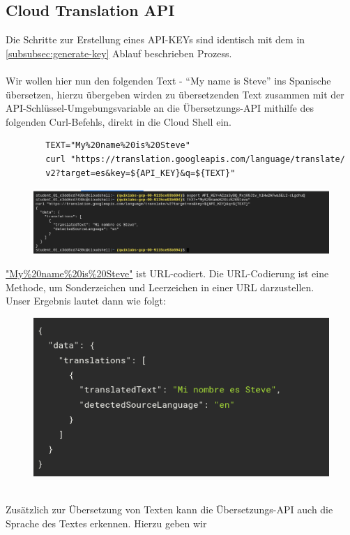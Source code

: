 \documentclass[12pt,a4paper]{article}
\begin{document}
\subsection{Cloud Translation API}
Die Schritte zur Erstellung eines API-KEYs sind identisch mit dem in \ref{subsubsec:generate-key} Ablauf beschrieben Prozess.
\\ \\
Wir wollen hier nun den folgenden Text - \enquote{My name is Steve} ins Spanische übersetzen, hierzu übergeben wirden zu übersetzenden Text zusammen mit der API-Schlüssel-Umgebungsvariable an die Übersetzungs-API mithilfe des folgenden Curl-Befehls, direkt in die Cloud Shell ein.
\begin{center}
	\begin{verbatim}
		TEXT="My%20name%20is%20Steve"
		curl "https://translation.googleapis.com/language/translate/
		v2?target=es&key=${API_KEY}&q=${TEXT}"
	\end{verbatim}
\end{center}
\begin{figure}[h!]
	\centering
	\includegraphics[width=1\linewidth]{../images/translation_API}
	\label{fig:translationapi}
\end{figure}
\url{"My%20name%20is%20Steve"} ist URL-codiert. Die URL-Codierung ist eine Methode, um Sonderzeichen und Leerzeichen in einer URL darzustellen. \\Unser Ergebnis lautet dann wie folgt:
\begin{figure}[h!]
	\centering
	\includegraphics[width=0.7\linewidth]{../images/result_translate}
	\label{fig:resulttranslate}
\end{figure}
\ \\
Zusätzlich zur Übersetzung von Texten kann die Übersetzungs-API auch die Sprache des Textes erkennen. Hierzu geben wir 
\end{document}
